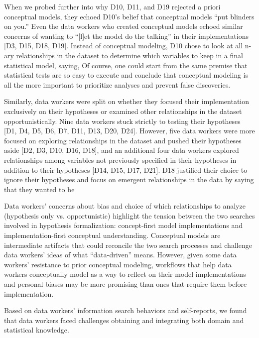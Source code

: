 When we probed further into why D10, D11, and D19 rejected a priori conceptual
models, they echoed D10's belief that conceptual models ``put blinders on you.''
Even the data workers who created conceptual models echoed similar concerns of
wanting to ``[l]et the model do the talking'' in their implementations [D3, D15,
D18, D19]. Instead of conceptual modeling, D10 chose to look at all n-ary
relationships in the dataset to determine which variables to keep in a final
statistical model, saying,  Of course, one could start from the
same premise that statistical tests are so easy to execute and conclude that
conceptual modeling is all the more important to prioritize analyses
and prevent false discoveries. 

Similarly, data workers were split on whether they focused their implementation exclusively on their
hypotheses or examined other relationships
in the dataset opportunistically. Nine data workers stuck strictly to testing their hypotheses [D1,
D4, D5, D6, D7, D11, D13, D20, D24]. However, five data workers were more focused on
exploring relationships in the dataset and pushed their hypotheses aside [D2,
D3, D10, D16, D18], and an additional four data workers explored relationships among
variables not previously specified in their hypotheses in addition to their
hypotheses [D14, D15, D17, D21]. D18 justified their choice to ignore their
hypotheses and focus on emergent relationships in the data by saying that they
wanted to be 

Data workers' concerns about bias and choice of which relationships to analyze
(hypothesis only vs. opportunistic) highlight the tension between the two
searches involved in hypothesis formalization: concept-first model
implementations and implementation-first conceptual understanding. Conceptual
models are intermediate artifacts that could reconcile the two search processes
and challenge data workers' ideas of what ``data-driven'' means. However, given some
data workers' resistance to prior conceptual modeling, workflows that help
data workers conceptually model as a way to reflect on their model implementations
and personal biases may be more promising than ones that require them before
implementation.

Based on data workers' information search behaviors and self-reports, we found that
data workers faced challenges obtaining and integrating both domain and statistical
knowledge.

